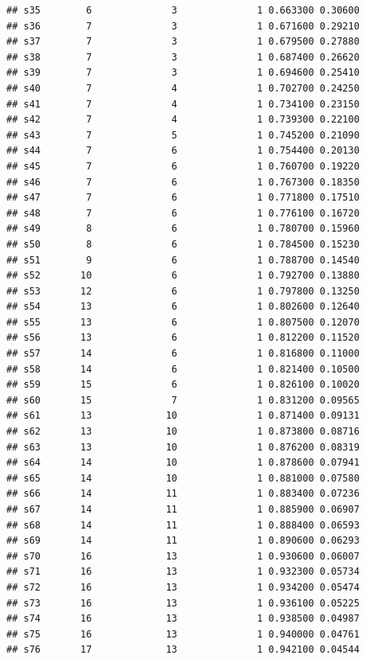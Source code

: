 \documentclass[12pt,letter]{article}\usepackage[]{graphicx}\usepackage[]{color}
\makeatletter
\newenvironment{kframe}{%
 \def\at@end@of@kframe{}%
 \ifinner\ifhmode%
  \def\at@end@of@kframe{\end{minipage}}%
  \begin{minipage}{\columnwidth}%
 \fi\fi%
 \def\FrameCommand##1{\hskip\@totalleftmargin \hskip-\fboxsep
 \colorbox{shadecolor}{##1}\hskip-\fboxsep
     \hskip-\linewidth \hskip-\@totalleftmargin \hskip\columnwidth}%
 \MakeFramed {\advance\hsize-\width
   \@totalleftmargin\z@ \linewidth\hsize
   \@setminipage}}%
 {\par\unskip\endMakeFramed%
 \at@end@of@kframe}
\newenvironment{knitrout}{}{} %
\makeatother
\begin{document}
\begin{knitrout}
\begin{kframe}
\begin{verbatim}
## s35        6              3              1 0.663300 0.30600
## s36        7              3              1 0.671600 0.29210
## s37        7              3              1 0.679500 0.27880
## s38        7              3              1 0.687400 0.26620
## s39        7              3              1 0.694600 0.25410
## s40        7              4              1 0.702700 0.24250
## s41        7              4              1 0.734100 0.23150
## s42        7              4              1 0.739300 0.22100
## s43        7              5              1 0.745200 0.21090
## s44        7              6              1 0.754400 0.20130
## s45        7              6              1 0.760700 0.19220
## s46        7              6              1 0.767300 0.18350
## s47        7              6              1 0.771800 0.17510
## s48        7              6              1 0.776100 0.16720
## s49        8              6              1 0.780700 0.15960
## s50        8              6              1 0.784500 0.15230
## s51        9              6              1 0.788700 0.14540
## s52       10              6              1 0.792700 0.13880
## s53       12              6              1 0.797800 0.13250
## s54       13              6              1 0.802600 0.12640
## s55       13              6              1 0.807500 0.12070
## s56       13              6              1 0.812200 0.11520
## s57       14              6              1 0.816800 0.11000
## s58       14              6              1 0.821400 0.10500
## s59       15              6              1 0.826100 0.10020
## s60       15              7              1 0.831200 0.09565
## s61       13             10              1 0.871400 0.09131
## s62       13             10              1 0.873800 0.08716
## s63       13             10              1 0.876200 0.08319
## s64       14             10              1 0.878600 0.07941
## s65       14             10              1 0.881000 0.07580
## s66       14             11              1 0.883400 0.07236
## s67       14             11              1 0.885900 0.06907
## s68       14             11              1 0.888400 0.06593
## s69       14             11              1 0.890600 0.06293
## s70       16             13              1 0.930600 0.06007
## s71       16             13              1 0.932300 0.05734
## s72       16             13              1 0.934200 0.05474
## s73       16             13              1 0.936100 0.05225
## s74       16             13              1 0.938500 0.04987
## s75       16             13              1 0.940000 0.04761
## s76       17             13              1 0.942100 0.04544

\end{verbatim}
\end{kframe}
\end{knitrout}
\end{document}
